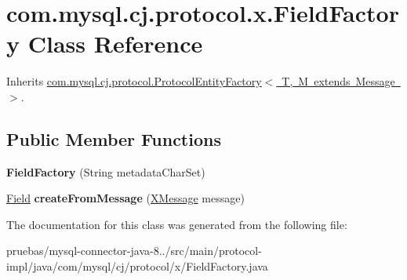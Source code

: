 \hypertarget{classcom_1_1mysql_1_1cj_1_1protocol_1_1x_1_1_field_factory}{}\section{com.\+mysql.\+cj.\+protocol.\+x.\+Field\+Factory Class Reference}
\label{classcom_1_1mysql_1_1cj_1_1protocol_1_1x_1_1_field_factory}


Inherits \mbox{\hyperlink{interfacecom_1_1mysql_1_1cj_1_1protocol_1_1_protocol_entity_factory}{com.\+mysql.\+cj.\+protocol.\+Protocol\+Entity\+Factory$<$ T, M extends Message $>$}}.

\subsection*{Public Member Functions}
\begin{DoxyCompactItemize}
\item 
\mbox{\label{classcom_1_1mysql_1_1cj_1_1protocol_1_1x_1_1_field_factory_a8139a4444bec551fb3c51df682202f7b}} 
{\bfseries Field\+Factory} (String metadata\+Char\+Set)
\item 
\mbox{\label{classcom_1_1mysql_1_1cj_1_1protocol_1_1x_1_1_field_factory_a931d4f5d7b65057a295f9e2ba8233986}} 
\mbox{\hyperlink{classcom_1_1mysql_1_1cj_1_1result_1_1_field}{Field}} {\bfseries create\+From\+Message} (\mbox{\hyperlink{classcom_1_1mysql_1_1cj_1_1protocol_1_1x_1_1_x_message}{X\+Message}} message)
\end{DoxyCompactItemize}


The documentation for this class was generated from the following file\+:\begin{DoxyCompactItemize}
\item 
pruebas/mysql-\/connector-\/java-\/8../src/main/protocol-\/impl/java/com/mysql/cj/protocol/x/Field\+Factory.\+java\end{DoxyCompactItemize}
